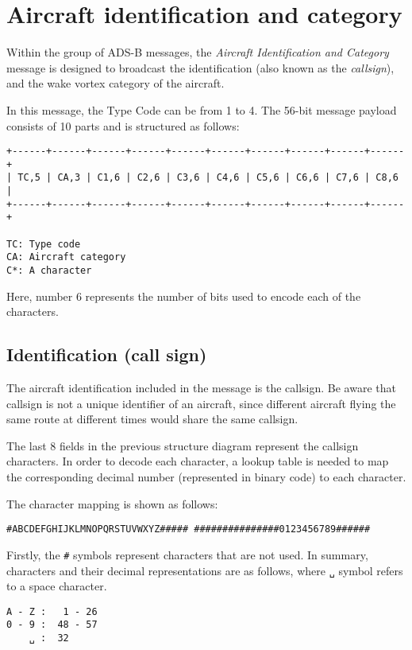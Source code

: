 \chapter{Aircraft identification and category}

Within the group of ADS-B messages, the \emph{Aircraft Identification and Category} message is designed to broadcast the identification (also known as the \emph{callsign}), and the wake vortex category of the aircraft.

In this message, the Type Code can be from 1 to 4. The 56-bit message payload consists of 10 parts and is structured as follows:

\begin{verbatim}
+------+------+------+------+------+------+------+------+------+------+
| TC,5 | CA,3 | C1,6 | C2,6 | C3,6 | C4,6 | C5,6 | C6,6 | C7,6 | C8,6 |
+------+------+------+------+------+------+------+------+------+------+

TC: Type code
CA: Aircraft category
C*: A character
\end{verbatim}

Here, number 6 represents the number of bits used to encode each of the characters.

\section{Identification (call sign)}
The aircraft identification included in the message is the callsign. Be aware that callsign is not a unique identifier of an aircraft, since different aircraft flying the same route at different times would share the same callsign.

The last 8 fields in the previous structure diagram represent the callsign characters. In order to decode each character, a lookup table is needed to map the corresponding decimal number (represented in binary code) to each character.

The character mapping is shown as follows:

\begin{verbatim}
#ABCDEFGHIJKLMNOPQRSTUVWXYZ##### ###############0123456789######
\end{verbatim}

Firstly, the \texttt{\#} symbols represent characters that are not used. In summary, characters and their decimal representations are as follows, where  \texttt{␣} symbol refers to a space character. 

\begin{verbatim}
A - Z :   1 - 26
0 - 9 :  48 - 57
    ␣ :  32
\end{verbatim}


